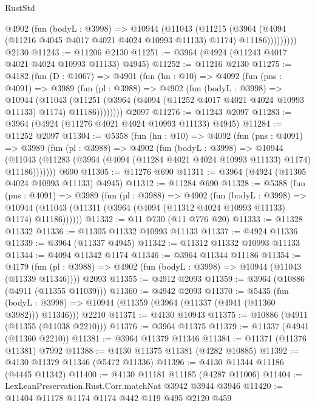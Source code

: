 \begin{lexlean}{RustStd}
\begin{coremodule}
            @4902
              (fun (bodyL : @3998) =>
              @10944
                (@11043
                  (@11215
                    (@3964
                      (@4094 (@11216 @4045 @4017 @4021 @4024 @10993 @11133) @1174)
                      @11186)))))))))
    @2130
@11243 := @11206 @2130
@11251 := @3964 (@4924 (@11243 @4017 @4021 @4024 @10993 @11133) @4945)
@11252 := @11216 @2130
@11275 := @4182
    (fun (D : @1067) =>
    @4901
      (fun (hn : @10) =>
      @4092
        (fun (pns : @4091) =>
        @3989
          (fun (pl : @3988) =>
          @4902
            (fun (bodyL : @3998) =>
            @10944
              (@11043
                (@11251 (@3964 (@4094 (@11252 @4017 @4021 @4024 @10993 @11133) @1174) @11186))))))))
    @2097
@11276 := @11243 @2097
@11283 := @3964 (@4924 (@11276 @4021 @4024 @10993 @11133) @4945)
@11284 := @11252 @2097
@11304 := @5358
    (fun (hn : @10) =>
    @4092
      (fun (pns : @4091) =>
      @3989
        (fun (pl : @3988) =>
        @4902
          (fun (bodyL : @3998) =>
          @10944
            (@11043 (@11283 (@3964 (@4094 (@11284 @4021 @4024 @10993 @11133) @1174) @11186)))))))
    @690
@11305 := @11276 @690
@11311 := @3964 (@4924 (@11305 @4024 @10993 @11133) @4945)
@11312 := @11284 @690
@11328 := @5388
    (fun (pns : @4091) =>
    @3989
      (fun (pl : @3988) =>
      @4902
        (fun (bodyL : @3998) =>
        @10944 (@11043 (@11311 (@3964 (@4094 (@11312 @4024 @10993 @11133) @1174) @11186))))))
@11332 := @11 @730 (@11 @776 @20)
@11333 := @11328 @11332
@11336 := @11305 @11332 @10993 @11133
@11337 := @4924 @11336
@11339 := @3964 (@11337 @4945)
@11342 := @11312 @11332 @10993 @11133
@11344 := @4094 @11342 @1174
@11346 := @3964 @11344 @11186
@11354 := @4179
    (fun (pl : @3988) => @4902 (fun (bodyL : @3998) => @10944 (@11043 (@11339 @11346))))
    @2093
@11355 := @4912 @2093
@11359 := @3964 (@10886 (@4911 (@11355 @11039)))
@11360 := @4942 @2093
@11370 := @5435
    (fun (bodyL : @3998) => @10944 (@11359 (@3964 (@11337 (@4941 (@11360 @3982))) @11346)))
    @2210
@11371 := @4130 @10943
@11375 := @10886 (@4911 (@11355 (@11038 @2210)))
@11376 := @3964 @11375
@11379 := @11337 (@4941 (@11360 @2210))
@11381 := @3964 @11379 @11346
@11384 := @11371 (@11376 @11381) @7992
@11388 := @4130 @11375 @11381 (@4282 @10885)
@11392 := @4130 @11379 @11346 (@5472 @11336)
@11396 := @4130 @11344 @11186 (@4445 @11342)
@11400 := @4130 @11181 @11185 (@4287 @11006)
@11404 := LexLeanPreservation.Rust.Corr.matchNat @3942 @3944 @3946
@11420 := @11404
    @11178
    @1174
    @1174
    @442
    @119
    @495
    @2120
    @459

\end{coremodule}
\end{lexlean}
